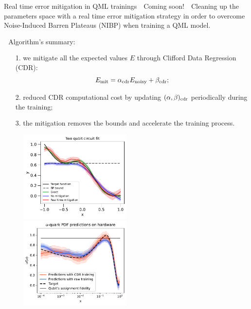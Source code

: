 \documentclass[8pt, xcolor={svgnames}]{beamer}
\begin{document}
\begin{frame}{Real time error mitigation in QML trainings \hfill \faBook\,\, Coming soon!}
\small
\faCrosshairs\,\, Cleaning up the parameters space with a real time error mitigation
strategy in order to overcome Noise-Induced Barren Plateaus (NIBP) when training 
a QML model.

\faFlash\,\, Algorithm's summary:

\begin{itemize}[noitemsep]
\item[1.] we mitigate all the expected values $E$ through Clifford Data Regression (CDR):
\begin{equation}
E_{\rm mit} = \alpha_{\rm cdr} E_{\rm noisy} + \beta_{\rm cdr};
\end{equation}
\item[2.] reduced CDR computational cost by updating $(\alpha, \beta)_{\rm cdr}$
periodically during the training;
\item[3.] the mitigation removes the bounds and accelerate the training process.
\end{itemize}
\begin{figure}  
    \includegraphics[width=0.5\textwidth]{figures/fits_benchmark.pdf}%
    \includegraphics[width=0.5\textwidth]{figures/hardware.pdf}
\end{figure}
\end{frame}
\end{document}

